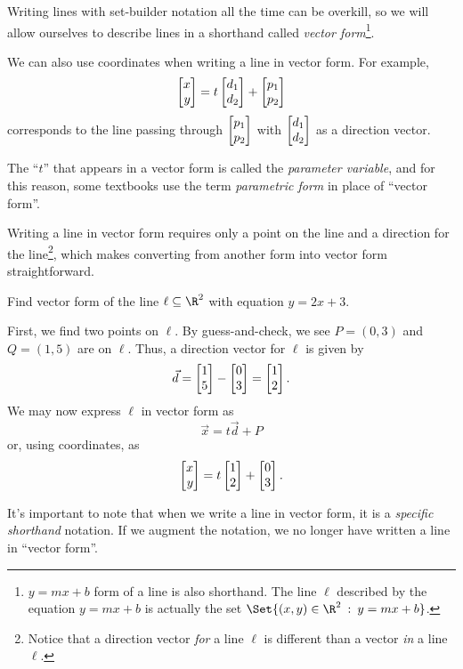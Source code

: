 \medskip
Writing lines with set-builder notation all the time can be overkill,
so we will allow ourselves to describe lines in a shorthand called \emph{vector form}\footnote{
	$y=mx+b$ form of a line is also shorthand.  The line $\ell$ described by the equation
	$y=mx+b$ is actually the set $\Set{(x,y)\in\R^2\given y=mx+b}$.
}.


We can also use coordinates when writing a line in vector form. For example,
\[
	\mat{x\\y}=t\mat{d_1\\d_2}+\mat{p_1\\p_2}
\]
corresponds to the line passing through $\mat{p_1\\p_2}$ with $\mat{d_1\\d_2}$ as a direction vector.

The ``$t$'' that appears in a vector form is called the \emph{parameter variable}, and for this
reason, some textbooks use the term \emph{parametric form} in place of ``vector form''. 

\medskip
Writing a line in vector form requires only a point on the line and a direction for the line\footnote{ Notice that
a direction vector \emph{for} a line $\ell$ is different than a vector \emph{in} a line $\ell$.},
which makes converting from another form into vector form straightforward.
\begin{example}
	Find vector form of the line $\ell\subseteq\R^2$ with equation $y=2x+3$.

	First, we find two
	points on $\ell$.  By guess-and-check, we see $P=(0,3)$ and $Q=(1,5)$ are on $\ell$.
	Thus, a direction vector for $\ell$ is given by
	\[
		\vec d = \mat{1\\5}-\mat{0\\3}=\mat{1\\2}.
	\]
	We may now express $\ell$ in vector form as
	\[
		\vec x=t\vec d+P
	\]
	or, using coordinates, as
	\[
		\mat{x\\y} = t\mat{1\\2}+\mat{0\\3}.
	\]
\end{example}

It's important to note that when we write a line in vector form, it is a \emph{specific shorthand} notation.
If we augment the notation, we no longer have written a line in ``vector form''.

